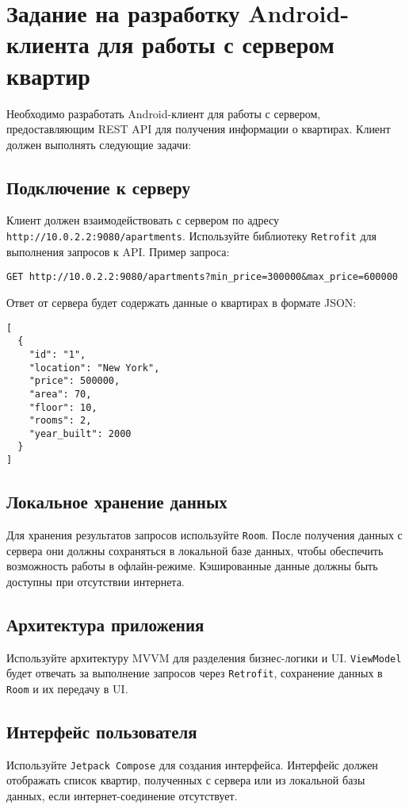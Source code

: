\section{Задание на разработку Android-клиента для работы с сервером квартир}

Необходимо разработать Android-клиент для работы с сервером, предоставляющим REST API для получения информации о квартирах. Клиент должен выполнять следующие задачи:

\subsection{Подключение к серверу}
Клиент должен взаимодействовать с сервером по адресу \texttt{http://10.0.2.2:9080/apartments}. Используйте библиотеку \texttt{Retrofit} для выполнения запросов к API. Пример запроса:

\begin{verbatim}
GET http://10.0.2.2:9080/apartments?min_price=300000&max_price=600000
\end{verbatim}

Ответ от сервера будет содержать данные о квартирах в формате JSON:

\begin{verbatim}
[
  {
    "id": "1",
    "location": "New York",
    "price": 500000,
    "area": 70,
    "floor": 10,
    "rooms": 2,
    "year_built": 2000
  }
]
\end{verbatim}

\subsection{Локальное хранение данных}
Для хранения результатов запросов используйте \texttt{Room}. После получения данных с сервера они должны сохраняться в локальной базе данных, чтобы обеспечить возможность работы в офлайн-режиме. Кэшированные данные должны быть доступны при отсутствии интернета.

\subsection{Архитектура приложения}
Используйте архитектуру MVVM для разделения бизнес-логики и UI. \texttt{ViewModel} будет отвечать за выполнение запросов через \texttt{Retrofit}, сохранение данных в \texttt{Room} и их передачу в UI.

\subsection{Интерфейс пользователя}
Используйте \texttt{Jetpack Compose} для создания интерфейса. Интерфейс должен отображать список квартир, полученных с сервера или из локальной базы данных, если интернет-соединение отсутствует.

